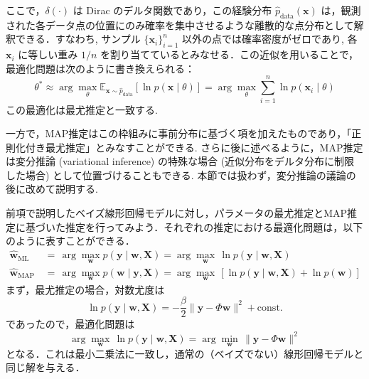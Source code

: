 \documentclass[titlepage]{ltjsbook}
\begin{document}
ここで，$\delta(\cdot)$ は Dirac のデルタ関数であり，この経験分布 $\hat{p}_{\mathrm{data}}(\mathbf{x})$ は，観測された各データ点の位置にのみ確率を集中させるような離散的な点分布として解釈できる．すなわち, サンプル $\{\mathbf{x}_i\}_{i=1}^n$ 以外の点では確率密度がゼロであり, 各 $\mathbf{x}_i$ に等しい重み $1/n$ を割り当てているとみなせる．この近似を用いることで，最適化問題は次のように書き換えられる：
\begin{equation}
\theta^* \approx \arg\max_\theta \mathbb{E}_{\mathbf{x} \sim \hat{p}_{\mathrm{data}}} \left[ \ln p(\mathbf{x}\mid \theta) \right]
= \arg\max_\theta \sum_{i=1}^n \ln p(\mathbf{x}_i \mid \theta)
\end{equation}
この最適化は最尤推定と一致する. 

一方で，MAP推定はこの枠組みに事前分布に基づく項を加えたものであり，「正則化付き最尤推定」とみなすことができる. さらに後に述べるように，MAP推定は変分推論 (variational inference) の特殊な場合 (近似分布をデルタ分布に制限した場合) として位置づけることもできる. 本節では扱わず，変分推論の議論の後に改めて説明する. 

前項で説明したベイズ線形回帰モデルに対し，パラメータの最尤推定とMAP推定に基づいた推定を行ってみよう．それぞれの推定における最適化問題は，以下のように表すことができる．
\begin{align}
\hat{\mathbf{w}}_{\mathrm{ML}}\,&=\, \arg\max_{\mathbf{w}} p(\mathbf{y} \mid \mathbf{w}, \mathbf{X}) = \arg\max_{\mathbf{w}}\, \ln p(\mathbf{y} \mid \mathbf{w}, \mathbf{X})\\
\hat{\mathbf{w}}_{\mathrm{MAP}}\,&=\, \arg\max_{\mathbf{w}} p(\mathbf{w} \mid \mathbf{y}, \mathbf{X}) = \arg\max_{\mathbf{w}}\, \left[\ln p(\mathbf{y} \mid \mathbf{w}, \mathbf{X})+ \ln p(\mathbf{w})\right]
\end{align}
まず，最尤推定の場合，対数尤度は
\begin{equation}
\ln p(\mathbf{y} \mid \mathbf{w}, \mathbf{X})=-\frac{\beta}{2}\lVert \mathbf{y}-\Phi\mathbf{w}\rVert^2 + \text{const.}
\end{equation}
であったので，最適化問題は
\begin{equation}
\arg\max_{\mathbf{w}}\,\ln p(\mathbf{y} \mid \mathbf{w}, \mathbf{X})=\arg\min_{\mathbf{w}}\,\lVert \mathbf{y}-\Phi\mathbf{w}\rVert^2
\end{equation}
となる．これは最小二乗法に一致し，通常の（ベイズでない）線形回帰モデルと同じ解を与える．
\end{document}
